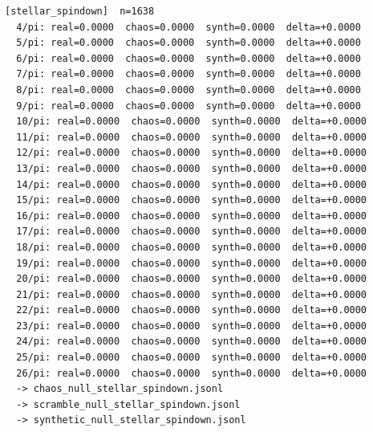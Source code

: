 \documentclass[11pt, letterpaper, openany]{book}
\begin{document}
\begin{empiricalbox}
\begin{lstlisting}[style=terminal]
[stellar_spindown]  n=1638
  4/pi: real=0.0000  chaos=0.0000  synth=0.0000  delta=+0.0000
  5/pi: real=0.0000  chaos=0.0000  synth=0.0000  delta=+0.0000
  6/pi: real=0.0000  chaos=0.0000  synth=0.0000  delta=+0.0000
  7/pi: real=0.0000  chaos=0.0000  synth=0.0000  delta=+0.0000
  8/pi: real=0.0000  chaos=0.0000  synth=0.0000  delta=+0.0000
  9/pi: real=0.0000  chaos=0.0000  synth=0.0000  delta=+0.0000
  10/pi: real=0.0000  chaos=0.0000  synth=0.0000  delta=+0.0000
  11/pi: real=0.0000  chaos=0.0000  synth=0.0000  delta=+0.0000
  12/pi: real=0.0000  chaos=0.0000  synth=0.0000  delta=+0.0000
  13/pi: real=0.0000  chaos=0.0000  synth=0.0000  delta=+0.0000
  14/pi: real=0.0000  chaos=0.0000  synth=0.0000  delta=+0.0000
  15/pi: real=0.0000  chaos=0.0000  synth=0.0000  delta=+0.0000
  16/pi: real=0.0000  chaos=0.0000  synth=0.0000  delta=+0.0000
  17/pi: real=0.0000  chaos=0.0000  synth=0.0000  delta=+0.0000
  18/pi: real=0.0000  chaos=0.0000  synth=0.0000  delta=+0.0000
  19/pi: real=0.0000  chaos=0.0000  synth=0.0000  delta=+0.0000
  20/pi: real=0.0000  chaos=0.0000  synth=0.0000  delta=+0.0000
  21/pi: real=0.0000  chaos=0.0000  synth=0.0000  delta=+0.0000
  22/pi: real=0.0000  chaos=0.0000  synth=0.0000  delta=+0.0000
  23/pi: real=0.0000  chaos=0.0000  synth=0.0000  delta=+0.0000
  24/pi: real=0.0000  chaos=0.0000  synth=0.0000  delta=+0.0000
  25/pi: real=0.0000  chaos=0.0000  synth=0.0000  delta=+0.0000
  26/pi: real=0.0000  chaos=0.0000  synth=0.0000  delta=+0.0000
  -> chaos_null_stellar_spindown.jsonl
  -> scramble_null_stellar_spindown.jsonl
  -> synthetic_null_stellar_spindown.jsonl


\end{lstlisting}
\end{empiricalbox}
\end{document}
